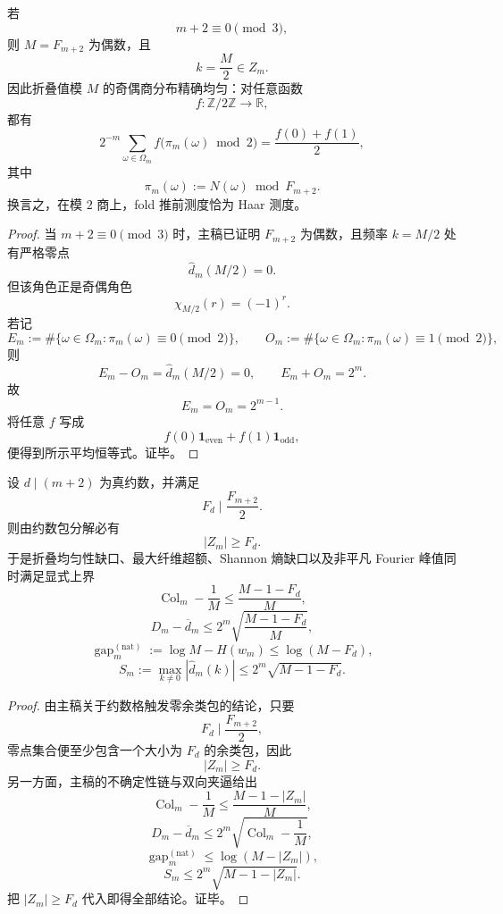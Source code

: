 \begin{theorem}\label{thm:conclusion-fold-mod2-exact-haarization}
若
\[
m+2\equiv 0\pmod 3,
\]
则 \(M=F_{m+2}\) 为偶数，且
\[
k=\frac{M}{2}\in Z_m.
\]
因此折叠值模 \(M\) 的奇偶商分布精确均匀：对任意函数
\[
f:\mathbb Z/2\mathbb Z\to\mathbb R,
\]
都有
\[
2^{-m}\sum_{\omega\in\Omega_m}f\!\bigl(\pi_m(\omega)\bmod 2\bigr)
=
\frac{f(0)+f(1)}{2},
\]
其中
\[
\pi_m(\omega):=N(\omega)\bmod F_{m+2}.
\]
换言之，在模 \(2\) 商上，fold 推前测度恰为 Haar 测度。
\end{theorem}
\begin{proof}
当 \(m+2\equiv0\pmod3\) 时，主稿已证明 \(F_{m+2}\) 为偶数，且频率 \(k=M/2\) 处有严格零点
\[
\widehat d_m(M/2)=0.
\]
但该角色正是奇偶角色
\[
\chi_{M/2}(r)=(-1)^r.
\]
若记
\[
E_m:=\#\{\omega\in\Omega_m:\pi_m(\omega)\equiv0\pmod2\},
\qquad
O_m:=\#\{\omega\in\Omega_m:\pi_m(\omega)\equiv1\pmod2\},
\]
则
\[
E_m-O_m=\widehat d_m(M/2)=0,
\qquad
E_m+O_m=2^m.
\]
故
\[
E_m=O_m=2^{m-1}.
\]
将任意 \(f\) 写成
\[
f(0)\mathbf 1_{\mathrm{even}}+f(1)\mathbf 1_{\mathrm{odd}},
\]
便得到所示平均恒等式。证毕。
\end{proof}

\begin{theorem}[约数包对可见不均匀性的同步压低]\label{thm:conclusion-zero-packet-synchronous-visible-suppression}
设 \(d\mid(m+2)\) 为真约数，并满足
\[
F_d\mid \frac{F_{m+2}}{2}.
\]
则由约数包分解必有
\[
|Z_m|\ge F_d.
\]
于是折叠均匀性缺口、最大纤维超额、Shannon 熵缺口以及非平凡 Fourier 峰值同时满足显式上界
\[
\operatorname{Col}_m-\frac1M
\le
\frac{M-1-F_d}{M},
\]
\[
D_m-\overline d_m
\le
2^m\sqrt{\frac{M-1-F_d}{M}},
\]
\[
\operatorname{gap}^{(\mathrm{nat})}_m
:=
\log M-H(w_m)
\le
\log(M-F_d),
\]
\[
S_m:=\max_{k\neq 0}|\widehat d_m(k)|
\le
2^m\sqrt{M-1-F_d}.
\]
\end{theorem}
\begin{proof}
由主稿关于约数格触发零余类包的结论，只要
\[
F_d\mid \frac{F_{m+2}}{2},
\]
零点集合便至少包含一个大小为 \(F_d\) 的余类包，因此
\[
|Z_m|\ge F_d.
\]
另一方面，主稿的不确定性链与双向夹逼给出
\[
\operatorname{Col}_m-\frac1M\le \frac{M-1-|Z_m|}{M},
\]
\[
D_m-\overline d_m\le 2^m\sqrt{\operatorname{Col}_m-\frac1M},
\]
\[
\operatorname{gap}^{(\mathrm{nat})}_m\le \log(M-|Z_m|),
\]
\[
S_m\le 2^m\sqrt{M-1-|Z_m|}.
\]
把 \(|Z_m|\ge F_d\) 代入即得全部结论。证毕。
\end{proof}

